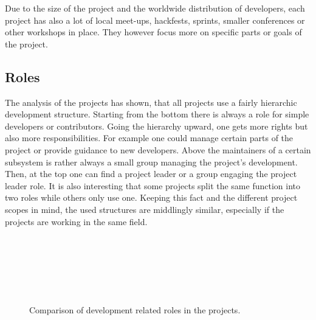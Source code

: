 Due to the size of the project and the worldwide distribution of developers,
each project has also a lot of local meet-ups, hackfests, sprints, smaller
conferences or other workshops in place. They however focus more on specific
parts or goals of the project.


\subsection{Roles} %

The analysis of the projects has shown, that all projects use a fairly
hierarchic development structure. Starting from the bottom there is always a
role for simple developers or contributors. Going the hierarchy upward, one
gets more rights but also more responsibilities. For example one could manage
certain parts of the project or provide guidance to new developers. Above the
maintainers of a certain subsystem is rather always a small group managing the
project's development. Then, at the top one can find a project leader or a
group engaging the project leader role. It is also interesting that some
projects split the same function into two roles while others only use one.
Keeping this fact and the different project scopes in mind, the used structures
are middlingly similar, especially if the projects are working in the same
field.

\begin{figure}[htbp]
  \centering
   \qquad
   \\

   \qquad
   \\

   \qquad
   \\

   \qquad
   \\

   \qquad
   \\
  \caption[Comparison of development related roles]
  {Comparison of development related roles in the projects.}
\end{figure}

